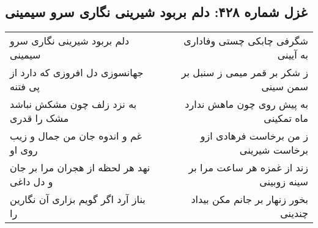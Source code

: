 \begin{center}
\section*{غزل شماره ۴۲۸: دلم بربود شیرینی نگاری سرو سیمینی}
\label{sec:428}
\begin{longtable}{l p{0.5cm} r}
دلم بربود شیرینی نگاری سرو سیمینی
&&
شگرفی چابکی چستی وفاداری به آیینی
\\
جهانسوزی دل افروزی که دارد از پی فتنه
&&
ز شکر بر قمر میمی ز سنبل بر سمن سینی
\\
به نزد زلف چون مشکش نباشد مشک را قدری
&&
به پیش روی چون ماهش ندارد ماه تمکینی
\\
غم و اندوه جان من جمال و زیب روی او
&&
ز من برخاست فرهادی ازو برخاست شیرینی
\\
نهد هر لحظه از هجران مرا بر جان و دل داغی
&&
زند از غمزه هر ساعت مرا بر سینه زوبینی
\\
بناز آرد اگر گویم بزاری آن نگارین را
&&
بخور زنهار بر جانم مکن بیداد چندینی
\\
\end{longtable}
\end{center}
